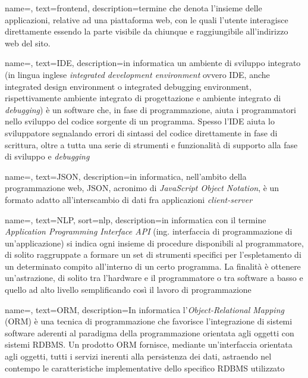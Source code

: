 {
    name=,
    text=frontend,
    description={termine che denota l’insieme delle applicazioni, relative ad una piattaforma
web, con le quali l’utente interagisce direttamente essendo la parte visibile da chiunque e raggiungibile all'indirizzo web del sito.}
}

{
    name=,
    text=IDE,
    description={in informatica un ambiente di sviluppo
integrato (in lingua inglese \emph{integrated development environment} ovvero IDE,
anche integrated design environment o integrated debugging environment, rispettivamente
ambiente integrato di progettazione e ambiente integrato di \emph{debugging})
è un software che, in fase di programmazione, aiuta i programmatori nello sviluppo
del codice sorgente di un programma. Spesso l’IDE aiuta lo sviluppatore
segnalando errori di sintassi del codice direttamente in fase di scrittura, oltre a
tutta una serie di strumenti e funzionalità di supporto alla fase di sviluppo e
\emph{debugging}}
}

{
    name=,
    text=JSON,
    description={in informatica, nell’ambito della programmazione
web, JSON, acronimo di \emph{JavaScript Object Notation}, è un formato adatto
all’interscambio di dati fra applicazioni \emph{client-server}}
}

{
    name=,
    text=NLP,
    sort=nlp,
    description={in informatica con il termine \emph{Application Programming Interface API} (ing. interfaccia di programmazione di un'applicazione) si indica ogni insieme di procedure disponibili al programmatore, di solito raggruppate a formare un set di strumenti specifici per l'espletamento di un determinato compito all'interno di un certo programma. La finalità è ottenere un'astrazione, di solito tra l'hardware e il programmatore o tra software a basso e quello ad alto livello semplificando così il lavoro di programmazione}
}

{
    name=,
    text=ORM,
    description={In informatica l'\emph{Object-Relational Mapping} (ORM) è una tecnica di programmazione che favorisce l'integrazione di sistemi software aderenti al paradigma della programmazione orientata agli oggetti con sistemi RDBMS.
Un prodotto ORM fornisce, mediante un'interfaccia orientata agli oggetti, tutti i servizi inerenti alla persistenza dei dati, astraendo nel contempo le caratteristiche implementative dello specifico RDBMS utilizzato}
}

